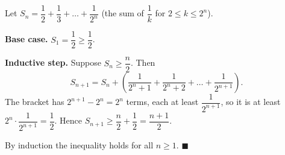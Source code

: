 Let $S_n=\dfrac{1}{2}+\dfrac{1}{3}+\dots+\dfrac{1}{2^n}$ (the sum of $\dfrac{1}{k}$ for $2\le k\le2^n$).

\textbf{Base case.} $S_1=\dfrac{1}{2}\ge\dfrac{1}{2}$.

\textbf{Inductive step.} Suppose $S_n\ge\dfrac {n}{2}$. Then
\[
S_{n+1}=S_n+\left(\dfrac{1}{2^n+1}+\dfrac{1}{2^n+2}+\dots+\dfrac{1}{2^{n+1}}\right).
\]
The bracket has $2^{n+1}-2^n=2^n$ terms, each at least $\dfrac{1}{2^{n+1}}$, so it is at least $2^n\cdot\dfrac{1}{2^{n+1}}=\dfrac{1}{2}$. Hence $S_{n+1}\ge\dfrac {n}{2}+\dfrac{1}{2}=\dfrac{n+1}{2}$.

By induction the inequality holds for all $n\ge1$. $\blacksquare$

